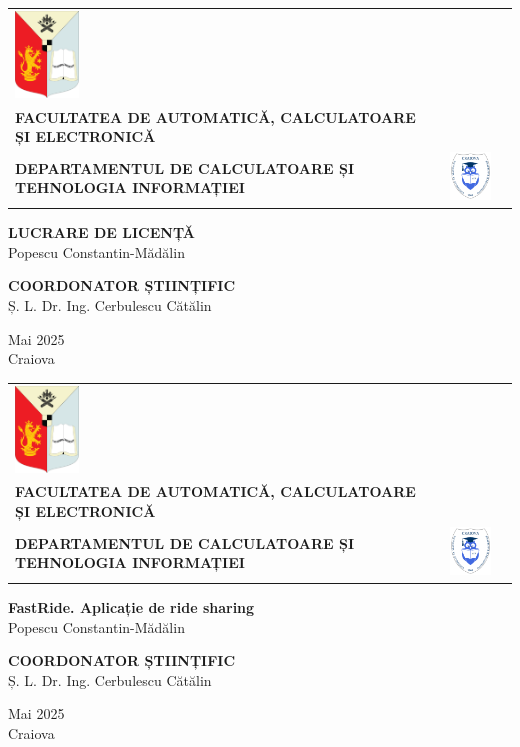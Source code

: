 \newcommand{\headerpage}[1]
{
\begin{center}
  \begin{tabular}{m{2cm} m{10cm} m{2cm}}
    \includegraphics[width=1.7cm]{Assets/left-logo.png} &
    \centering
    {\fontsize{10pt}{10pt}\selectfont
      \textbf{UNIVERSITATEA DIN CRAIOVA} \\[0.3em]
      \textbf{FACULTATEA DE AUTOMATICĂ, CALCULATOARE ȘI ELECTRONICĂ} \\[0.7em]
      \textbf{DEPARTAMENTUL DE CALCULATOARE ȘI TEHNOLOGIA INFORMAȚIEI}
    } &
    \includegraphics[width=1.7cm]{Assets/right-logo.png}
  \end{tabular}
\end{center}

\vspace{4cm}

\begin{center}
  {\fontsize{14pt}{14pt}\selectfont
   \textbf{#1} \\[1em]
  {Popescu Constantin-Mădălin}
  }
\end{center}

\vspace{3cm}

\begin{center}
   {\fontsize{12pt}{12pt}\selectfont
   \textbf{COORDONATOR ȘTIINȚIFIC} \\[1em]
   {Ș. L. Dr. Ing. Cerbulescu Cătălin}
   }
\end{center}

\vfill

\begin{center}
  {\fontsize{12pt}{12pt}\selectfont Mai 2025 \\
  Craiova}
\end{center}
}

\thispagestyle{empty}
\headerpage{LUCRARE DE LICENȚĂ}

\newpage
\thispagestyle{empty}
\headerpage{FastRide. Aplicație de ride sharing}

\newpage
\thispagestyle{empty}
\null
\newpage